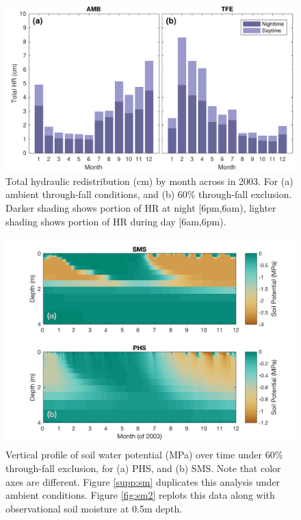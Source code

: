 \documentclass[draft,linenumbers]{agujournal}
\begin{document}
    \clearpage
    \begin{figure}[h]
     \centering
     \includegraphics[width=30pc]{../figs3/hr.pdf}
     \caption{Total hydraulic redistribution (cm) by month across in 2003. For (a) ambient through-fall conditions, and (b) 60\% through-fall exclusion. 
     Darker shading shows portion of HR at night [6pm,6am), lighter shading shows portion of HR during day [6am,6pm).}
     \label{fig:hr}
  \end{figure}

  
      \clearpage
    \begin{figure}[h]
     \centering
     \includegraphics[width=30pc]{../figs3/smp.jpg}
     \caption{Vertical profile of soil water potential (MPa) over time under 60\% through-fall exclusion, for
     (a) PHS, and 
     (b) SMS.
     Note that color axes are different.
     Figure \ref{supp:sm} duplicates this analysis under ambient conditions.
     Figure \ref{fig:sm2} replots this data along with observational soil moisture at 0.5m depth. }
     \label{fig:sm}
  \end{figure}
  
\end{document}

